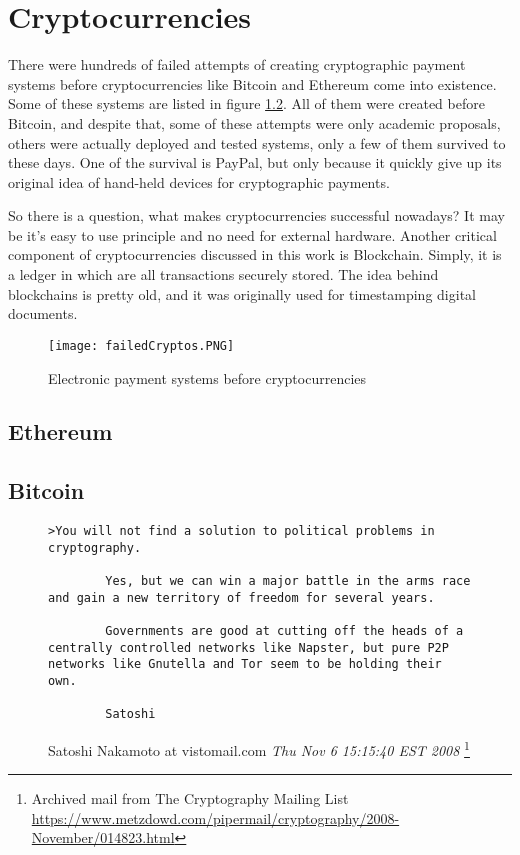 \chapter{Cryptocurrencies}

There were hundreds of failed attempts of creating cryptographic payment systems before cryptocurrencies like Bitcoin and Ethereum come into existence. Some of these systems are listed in figure \ref{paymentSystems}. All of them were created before Bitcoin, and despite that, some of these attempts were only academic proposals, others were actually deployed and tested systems, only a few of them survived to these days. One of the survival is PayPal, but only because it quickly give up its original idea of hand-held devices for cryptographic payments.\cite{wayner1997digital}

So there is a question, what makes cryptocurrencies successful nowadays?  It may be it's easy to use principle and no need for external hardware. 
Another critical component of cryptocurrencies discussed in this work is Blockchain. Simply, it is a ledger in which are all transactions securely stored. The idea behind blockchains is pretty old, and it was originally used for timestamping digital documents.\cite{haber1990time} 


\begin{figure}[H]
    \centering
    \texttt{[image: failedCryptos.PNG]}
    \caption{Electronic payment systems before cryptocurrencies \cite{narayanan2016bitcoin}}
    \label{paymentSystems}
\end{figure}

\section{Ethereum}


\section{Bitcoin}
\begin{figure}[H]
    \centering
    \begin{lstlisting}[breaklines=true]
        >You will not find a solution to political problems in cryptography.

        Yes, but we can win a major battle in the arms race and gain a new territory of freedom for several years.
        
        Governments are good at cutting off the heads of a centrally controlled networks like Napster, but pure P2P networks like Gnutella and Tor seem to be holding their own.  
        
        Satoshi
    \end{lstlisting}
    \caption{
        Satoshi Nakamoto at vistomail.com 
        \textit{Thu Nov 6 15:15:40 EST 2008}
        \protect\footnote{Archived mail from The Cryptography Mailing List 
            \url{https://www.metzdowd.com/pipermail/cryptography/2008-November/014823.html}
        }
    }
    \label{paymentSystems}
\end{figure}


